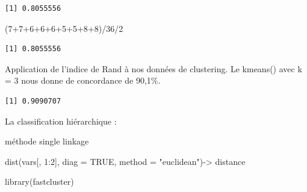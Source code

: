 \documentclass{article}
\newenvironment{Shaded}{\begin{snugshade}}{\end{snugshade}}
\newcommand{\AttributeTok}[1]{\textcolor[rgb]{0.40,0.45,0.13}{#1}}
\newcommand{\ConstantTok}[1]{\textcolor[rgb]{0.56,0.35,0.01}{#1}}
\newcommand{\DecValTok}[1]{\textcolor[rgb]{0.68,0.00,0.00}{#1}}
\newcommand{\FunctionTok}[1]{\textcolor[rgb]{0.28,0.35,0.67}{#1}}
\newcommand{\NormalTok}[1]{\textcolor[rgb]{0.00,0.23,0.31}{#1}}
\newcommand{\OtherTok}[1]{\textcolor[rgb]{0.00,0.23,0.31}{#1}}
\newcommand{\SpecialCharTok}[1]{\textcolor[rgb]{0.37,0.37,0.37}{#1}}
\newcommand{\StringTok}[1]{\textcolor[rgb]{0.13,0.47,0.30}{#1}}
\begin{document}
\begin{verbatim}
[1] 0.8055556
\end{verbatim}

\begin{Shaded}
\begin{Highlighting}[]
\NormalTok{(}\DecValTok{7}\SpecialCharTok{+}\DecValTok{7}\SpecialCharTok{+}\DecValTok{6}\SpecialCharTok{+}\DecValTok{6}\SpecialCharTok{+}\DecValTok{6}\SpecialCharTok{+}\DecValTok{5}\SpecialCharTok{+}\DecValTok{5}\SpecialCharTok{+}\DecValTok{8}\SpecialCharTok{+}\DecValTok{8}\NormalTok{)}\SpecialCharTok{/}\DecValTok{36}\SpecialCharTok{/}\DecValTok{2}
\end{Highlighting}
\end{Shaded}

\begin{verbatim}
[1] 0.8055556
\end{verbatim}

Application de l'indice de Rand à nos données de clustering. Le kmeans()
avec k = 3 nous donne de concordance de 90,1\%.

\begin{Shaded}
\end{Shaded}

\begin{verbatim}
[1] 0.9090707
\end{verbatim}

La classification hiérarchique :

méthode single linkage

\begin{Shaded}
\begin{Highlighting}[]
\FunctionTok{dist}\NormalTok{(vars[, }\DecValTok{1}\SpecialCharTok{:}\DecValTok{2}\NormalTok{], }\AttributeTok{diag =} \ConstantTok{TRUE}\NormalTok{, }\AttributeTok{method =} \StringTok{"euclidean"}\NormalTok{)}\OtherTok{{-}\textgreater{}}\NormalTok{ distance}
\end{Highlighting}
\end{Shaded}

\begin{Shaded}
\begin{Highlighting}[]
\FunctionTok{library}\NormalTok{(fastcluster)}
\end{Highlighting}
\end{Shaded}
\end{document}
